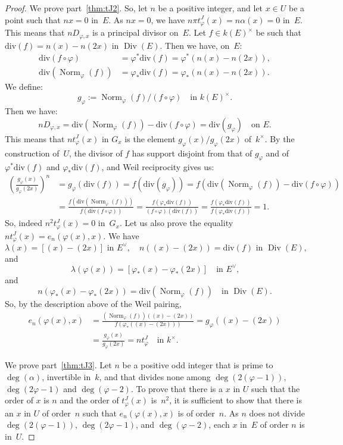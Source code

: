 \documentclass[JEP,XML,SOM,Unicode,NoFloatCountersInSection]{cedram}
\let\oldvee\vee
\renewcommand{\vee}{{\scriptscriptstyle\oldvee}}
\theoremstyle{plain}
\theoremstyle{definition}
\numberwithin{equation}{subsection}
\let\phi\varphi
\newcommand{\divisor}{\mathrm{div}}
\DeclareMathOperator{\Div}{Div}
\DeclareMathOperator{\Norm}{Norm}
\begin{document}
\begin{proof}
We prove part~\eqref{thm:tJ2}. So, let $n$ be a positive integer, and let $x\in U$
be a point such that $nx=0$ in~$E$. As $nx=0$, we have $n\pi
t^J_\phi(x)=n \alpha(x)=0$ in~$E$. This means that $nD_{\phi,x}$ is a
principal divisor on~$E$. Let $f\in k(E)^\times$ be such that
$\divisor(f)=n(x)-n(2x)$ in $\Div(E)$. Then we have, on~$E$:
\begin{align*}
\divisor(f\circ \phi) & = \phi^*\divisor(f) = \phi^*\left(n(x)-n(2x)\right),\\
\divisor(\Norm_\phi(f)) & = \phi_*\divisor(f) = \phi_*\left(n(x)-n(2x)\right).
\end{align*}
We define:
\[
g_\phi:=\Norm_\phi(f)/(f\circ \phi)\quad\text{in $k(E)^\times$.}
\]
Then we have:
\[
nD_{\phi,x} = \divisor(\Norm_\phi(f)) - \divisor(f\circ \phi) = \divisor(g_\phi)
\quad\text{on~$E$.}
\]
This means that $nt^J_\phi(x)$ in $G_x$ is the element $g_\phi(x)/g_\phi(2x)$ of~$k^\times$. By the
construction of~$U$, the divisor of $f$ has support disjoint from that of $g_\phi$ and of
$\phi^*\divisor(f)$ and $\phi_*\divisor(f)$, and Weil reciprocity gives us:
\begin{align*}
\left(\frac{g_\phi(x)}{g_\phi(2x)}\right)^n & = g_\phi(\divisor(f)) =
f(\divisor(g_\phi)) = f(\divisor(\Norm_\phi(f)) - \divisor(f\circ \phi))\\
& = \frac{f(\divisor(\Norm_\phi(f)))}{f(\divisor(f\circ \phi))} =
\frac{f(\phi_*\divisor(f))}{(f\circ \phi)(\divisor(f))} =
\frac{f(\phi_*\divisor(f))}{f(\phi_*\divisor(f))} = 1.
\end{align*}
So, indeed $n^2 t^J_\phi(x)=0$ in~$G_x$. Let us also
prove the equality $nt^J_\phi(x) = e_n(\phi(x),x)$. We have
\[
\text{$\lambda(x) = [(x)-(2x)]$ in $E^\vee$},\quad
\text{$n((x)-(2x)) =\divisor(f)$ in $\Div(E)$,}
\]
and
\[
\lambda(\phi(x)) = [\phi_*(x)-\phi_*(2x)] \quad\text{in $E^\vee$,}
\]
and
\[
n(\phi_*(x)-\phi_*(2x)) = \divisor(\Norm_\phi(f)) \quad \text{in $\Div(E)$}.
\]
So, by the description above of the Weil pairing,
\begin{align*}
e_n(\phi(x),x) & = \frac{(\Norm_\phi(f))((x) - (2x))}{f(\phi_*((x) - (2x)))} = g_\phi((x) - (2x)) \\
& = \frac{g_\phi(x)}{g_\phi(2x)} = nt^J_\phi \quad\text{in $k^\times$.}
\end{align*}

We prove part~\eqref{thm:tJ3}. Let $n$ be a positive odd integer that is prime to
$\deg(\alpha)$, invertible in~$k$, and that divides none among
$\deg(2(\phi-1))$, $\deg(2\phi-1)$ and $\deg(\phi-2)$. To prove that
there is a $x$ in $U$ such that the order of $x$ is $n$ and the order
of $t^J_\phi(x)$ is~$n^2$, it is sufficient to show that there is an
$x$ in $U$ of order~$n$ such that $e_n(\phi(x),x)$ is of order~$n$. As
$n$ does not divide $\deg(2(\phi-1))$, $\deg(2\phi-1)$, and
$\deg(\phi-2)$, each $x$ in~$E$ of order $n$ is in~$U$.


\end{proof}
\end{document}
